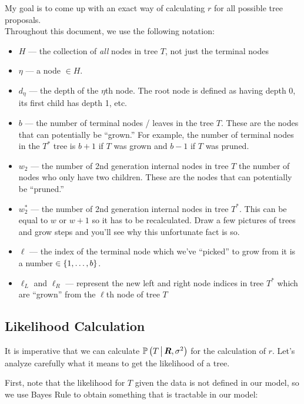 My goal is to come up with an exact way of calculating $r$ for all possible tree proposals.\\

Throughout this document, we use the following notation:

\begin{itemize}
\item $H$ ---  the collection of \textit{all} nodes in tree $T$, not just the terminal nodes
\item $\eta$ --- a node $\in H$.
\item $d_\eta$ --- the depth of the $\eta$th node. The root node is defined as having depth 0, its first child has depth 1, etc.
\item $b$ --- the number of terminal nodes / leaves in the tree $T$. These are the nodes that can potentially be ``grown.'' For example, the number of terminal nodes in the $T^*$ tree is $b+1$ if $T$ was grown and $b-1$ if $T$ was pruned.
\item $w_2$ --- the number of 2nd generation internal nodes in tree $T$ \ie the number of nodes who only have two children. These are the nodes that can potentially be ``pruned.''
\item $w_2^*$ --- the number of 2nd generation internal nodes in tree $T^*$. This can be equal to $w$ or $w+1$ so it has to be recalculated. Draw a few pictures of trees and grow steps and you'll see why this unfortunate fact is so.
\item  $\ell$ --- the index of the terminal node which we've ``picked'' to grow from it is a number $\in \left\{1, \ldots, b\right\}$.
\item $\ell_L$ and $\ell_R$ --- represent the new left and right node indices in tree $T^*$ which are ``grown'' from the $\ell$th node of tree $T$
\end{itemize}

\subsection*{Likelihood Calculation}

It is imperative that we can calculate $\mathbb{P}\left(T \, \big| \, \boldsymbol{R}, \sigma^2\right)$ for the calculation of $r$. Let's analyze carefully what it means to get the likelihood of a tree.

First, note that the likelihood for $T$ given the data is not defined in our model, so we use Bayes Rule to obtain something that is tractable in our model:

